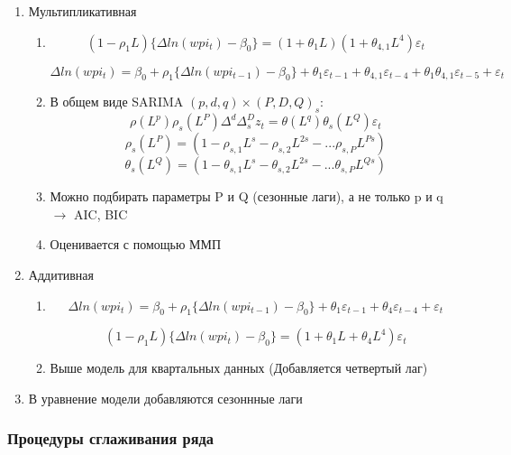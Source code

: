 \documentclass[a4paper, 12pt]{article}
\begin{document}
\begin{enumerate}
    \item Мультипликативная
    \begin{enumerate}
        \item \[(1 - \rho_1 L)\{\Delta ln(wpi_t) - \beta_0\} = (1 + \theta_1 L)(1 + \theta_{4, 1} L^4)\varepsilon_t\]
        
        \[\Delta ln(wpi_t) = \beta_0 + \rho_1\{\Delta ln(wpi_{t - 1}) - \beta_0\} + \theta_1 \varepsilon_{t - 1} + \theta_{4, 1} \varepsilon_{t - 4} + \theta_1 \theta_{4, 1} \varepsilon_{t - 5} + \varepsilon_t\]
        \item В общем виде SARIMA $(p, d , q) \times (P, D, Q)_s$:
        \[\rho(L^p) \rho_s(L^P) \Delta^d \Delta_s^D z_t = \theta(L^q) \theta_s(L^Q)\varepsilon_t\]
        \[\rho_s(L^P) = (1 - \rho_{s, 1}L^s - \rho_{s, 2}L^{2s} - ... \rho_{s, P}L^{Ps})\]
        \[\theta_s(L^Q) = (1 - \theta_{s, 1}L^s - \theta_{s, 2}L^{2s} - ... \theta_{s, P}L^{Qs})\]
        \item Можно подбирать параметры P и Q (сезонные лаги), а не только p и q $\rightarrow$ AIC, BIC
        \item Оценивается с помощью ММП
    \end{enumerate}
    \item Аддитивная
    \begin{enumerate}
        \item \[\Delta ln(wpi_t) = \beta_0 + \rho_1\{\Delta ln(wpi_{t - 1}) - \beta_0\} + \theta_1 \varepsilon_{t - 1} + \theta_4 \varepsilon_{t - 4} + \varepsilon_t\]
        
        \[(1 - \rho_1 L)\{\Delta ln(wpi_t) - \beta_0\} = (1 + \theta_1 L + \theta_4 L^4)\varepsilon_t\]
        \item Выше модель для квартальных данных (Добавляется четвертый лаг)
    \end{enumerate}
    \item В уравнение модели добавляются сезоннные лаги
\end{enumerate}

\subsubsection{Процедуры сглаживания ряда}
\end{document}
